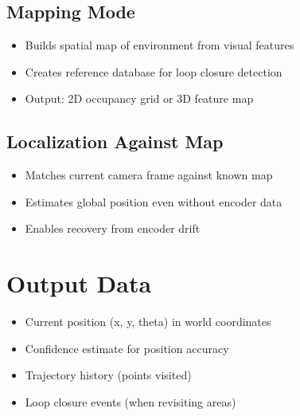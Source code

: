 \subsection{Mapping Mode}
\begin{itemize}
    \item Builds spatial map of environment from visual features
    \item Creates reference database for loop closure detection
    \item Output: 2D occupancy grid or 3D feature map
\end{itemize}

\subsection{Localization Against Map}
\begin{itemize}
    \item Matches current camera frame against known map
    \item Estimates global position even without encoder data
    \item Enables recovery from encoder drift
\end{itemize}

\section{Output Data}

\begin{itemize}
    \item Current position (x, y, theta) in world coordinates
    \item Confidence estimate for position accuracy
    \item Trajectory history (points visited)
    \item Loop closure events (when revisiting areas)
\end{itemize}


